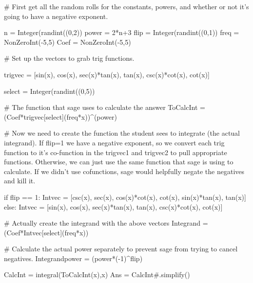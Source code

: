 

\begin{sagesilent}
# First get all the random rolls for the constants, powers, and whether or not it's going to have a negative exponent.

n = Integer(randint((0,2))
power = 2*n+3
flip = Integer(randint((0,1))
freq = NonZeroInt(-5,5)
Coef = NonZeroInt(-5,5)

# Set up the vectors to grab trig functions.

trigvec = [sin(x), cos(x), sec(x)*tan(x), tan(x), csc(x)*cot(x), cot(x)]

select = Integer(randint((0,5))

# The function that sage uses to calculate the answer
ToCalcInt = (Coef*trigvec[select](freq*x))^(power)

# Now we need to create the function the student sees to integrate (the actual integrand). If flip=1 we have a negative exponent, so we convert each trig function to it's co-function in the trigvec1 and trigvec2 to pull appropriate functions. Otherwise, we can just use the same function that sage is using to calculate. If we didn't use cofunctions, sage would helpfully negate the negatives and kill it.

if flip == 1:
    Intvec = [csc(x), sec(x), cos(x)*cot(x), cot(x), sin(x)*tan(x), tan(x)]
else:
    Intvec = [sin(x), cos(x), sec(x)*tan(x), tan(x), csc(x)*cot(x), cot(x)]

# Actually create the integrand with the above vectors
Integrand = (Coef*Intvec[select](freq*x))

# Calculate the actual power separately to prevent sage from trying to cancel negatives.
Integrandpower = (power*(-1)^flip)

CalcInt = integral(ToCalcInt(x),x)
Ans = CalcInt#.simplify()
\end{sagesilent}



